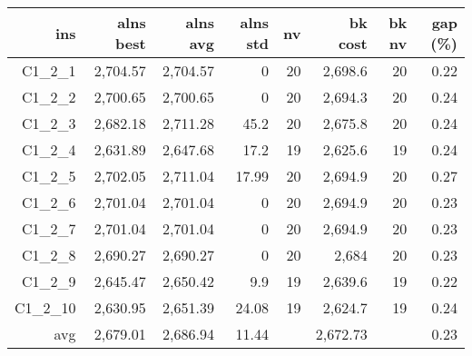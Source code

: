   \begin{table}[caption={Kết quả đo với tập HG\_C\_1\_2 200 yêu cầu}, label=exp:HGC12]
      \small
      \centering
      \begin{tabular}{rrrrrrrr}
        \hline
        ins & alns best & alns avg & alns std & nv & bk cost & bk nv & gap (\%) \\ \hline
        C1\_2\_1 & 2,704.57 & 2,704.57 & 0 & 20 & 2,698.6 & 20 & 0.22 \\ \hline
        C1\_2\_2 & 2,700.65 & 2,700.65 & 0 & 20 & 2,694.3 & 20 & 0.24 \\ \hline
        C1\_2\_3 & 2,682.18 & 2,711.28 & 45.2 & 20 & 2,675.8 & 20 & 0.24 \\ \hline
        C1\_2\_4 & 2,631.89 & 2,647.68 & 17.2 & 19 & 2,625.6 & 19 & 0.24 \\ \hline
        C1\_2\_5 & 2,702.05 & 2,711.04 & 17.99 & 20 & 2,694.9 & 20 & 0.27 \\ \hline
        C1\_2\_6 & 2,701.04 & 2,701.04 & 0 & 20 & 2,694.9 & 20 & 0.23 \\ \hline
        C1\_2\_7 & 2,701.04 & 2,701.04 & 0 & 20 & 2,694.9 & 20 & 0.23 \\ \hline
        C1\_2\_8 & 2,690.27 & 2,690.27 & 0 & 20 & 2,684 & 20 & 0.23 \\ \hline
        C1\_2\_9 & 2,645.47 & 2,650.42 & 9.9 & 19 & 2,639.6 & 19 & 0.22 \\ \hline
        C1\_2\_10 & 2,630.95 & 2,651.39 & 24.08 & 19 & 2,624.7 & 19 & 0.24 \\ \hline
        avg & 2,679.01 & 2,686.94 & 11.44 & & 2,672.73 & & 0.23 \\ \hline
      \end{tabular}
  \end{table}
    
